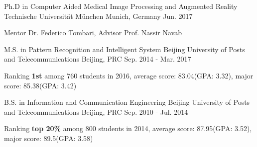 



\begin{cventries}

\cventry
{Ph.D in Computer Aided Medical Image Processing and Augmented Reality} %
{Technische Universität München} %
{Munich, Germany} %
{Jun. 2017} %
{ %
\begin{cvitems}
\item {Mentor Dr. Federico Tombari, Advisor Prof. Nassir Navab}
\end{cvitems}
}


\cventry
{M.S. in Pattern Recognition and Intelligent System} %
{Beijing University of Posts and Telecommunications} %
{Beijing, PRC} %
{Sep. 2014 - Mar. 2017} %
{ %
\begin{cvitems}
\item {Ranking \textbf{1st} among 760 students in 2016, average score: 83.04(GPA: 3.32), major score: 85.38(GPA: 3.42)}
\end{cvitems}
}


\cventry
{B.S. in Information and Communication Engineering} %
{Beijing University of Posts and Telecommunications} %
{Beijing, PRC} %
{Sep. 2010 - Jul. 2014} %
{ %
\begin{cvitems}
\item {Ranking \textbf{top 20\%} among 800 students in 2014, average score: 87.95(GPA: 3.52), major score: 89.5(GPA: 3.58)}
\end{cvitems}
}%

\end{cventries}
